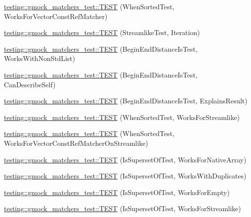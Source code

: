 \begin{DoxyCompactItemize}
\item 
\mbox{\hyperlink{namespacetesting_1_1gmock__matchers__test_a0975bae51ce06a819dc1437134fd7f05}{testing\+::gmock\+\_\+matchers\+\_\+test\+::\+T\+E\+ST}} (When\+Sorted\+Test, Works\+For\+Vector\+Const\+Ref\+Matcher)
\item 
\mbox{\hyperlink{namespacetesting_1_1gmock__matchers__test_a5aa4eed927d4a1a8ea306d5e47dce94f}{testing\+::gmock\+\_\+matchers\+\_\+test\+::\+T\+E\+ST}} (Streamlike\+Test, Iteration)
\item 
\mbox{\hyperlink{namespacetesting_1_1gmock__matchers__test_add74820690e798ae8a365d08b68ddf71}{testing\+::gmock\+\_\+matchers\+\_\+test\+::\+T\+E\+ST}} (Begin\+End\+Distance\+Is\+Test, Works\+With\+Non\+Std\+List)
\item 
\mbox{\hyperlink{namespacetesting_1_1gmock__matchers__test_aa4ef2a94a7d75aa6116e8537deaa5f56}{testing\+::gmock\+\_\+matchers\+\_\+test\+::\+T\+E\+ST}} (Begin\+End\+Distance\+Is\+Test, Can\+Describe\+Self)
\item 
\mbox{\hyperlink{namespacetesting_1_1gmock__matchers__test_a89445da783c74dfa09c9c09531646f5b}{testing\+::gmock\+\_\+matchers\+\_\+test\+::\+T\+E\+ST}} (Begin\+End\+Distance\+Is\+Test, Explains\+Result)
\item 
\mbox{\hyperlink{namespacetesting_1_1gmock__matchers__test_a8de8e3760418cfcd33913cd30f16d117}{testing\+::gmock\+\_\+matchers\+\_\+test\+::\+T\+E\+ST}} (When\+Sorted\+Test, Works\+For\+Streamlike)
\item 
\mbox{\hyperlink{namespacetesting_1_1gmock__matchers__test_aa6bfe7b6cc288d93f60b9f52e095b233}{testing\+::gmock\+\_\+matchers\+\_\+test\+::\+T\+E\+ST}} (When\+Sorted\+Test, Works\+For\+Vector\+Const\+Ref\+Matcher\+On\+Streamlike)
\item 
\mbox{\hyperlink{namespacetesting_1_1gmock__matchers__test_a1f8296847490a883c0e86f8f90e4c6d5}{testing\+::gmock\+\_\+matchers\+\_\+test\+::\+T\+E\+ST}} (Is\+Superset\+Of\+Test, Works\+For\+Native\+Array)
\item 
\mbox{\hyperlink{namespacetesting_1_1gmock__matchers__test_a1ae4040ea2af432956d7486bb3f85286}{testing\+::gmock\+\_\+matchers\+\_\+test\+::\+T\+E\+ST}} (Is\+Superset\+Of\+Test, Works\+With\+Duplicates)
\item 
\mbox{\hyperlink{namespacetesting_1_1gmock__matchers__test_a979b33284277cfca18fe91af3892667a}{testing\+::gmock\+\_\+matchers\+\_\+test\+::\+T\+E\+ST}} (Is\+Superset\+Of\+Test, Works\+For\+Empty)
\item 
\mbox{\hyperlink{namespacetesting_1_1gmock__matchers__test_a2606545708e4ce6d38284c66109f604d}{testing\+::gmock\+\_\+matchers\+\_\+test\+::\+T\+E\+ST}} (Is\+Superset\+Of\+Test, Works\+For\+Streamlike)

\end{DoxyCompactItemize}
